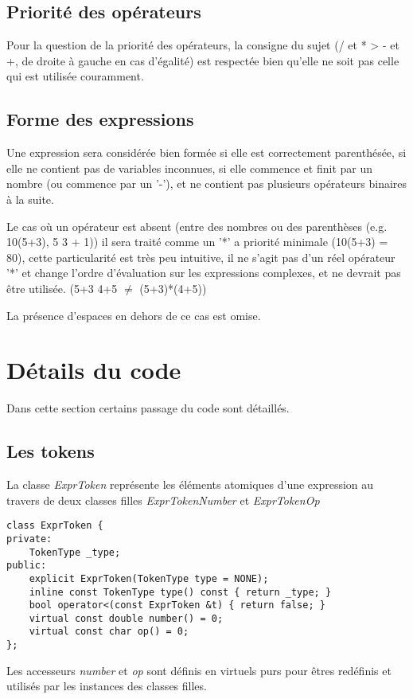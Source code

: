 \documentclass[]{article}
\begin{document}
\subsection{Priorité des opérateurs}
Pour la question de la priorité des opérateurs, la consigne du sujet (/ et * > - et +, de droite à gauche en cas d'égalité) est respectée bien qu'elle ne soit pas celle qui est utilisée couramment.

\subsection{Forme des expressions}
Une expression sera considérée bien formée si elle est correctement parenthésée, si elle ne contient pas 
de variables inconnues, si elle commence et finit par un nombre (ou commence par un '-'), et ne contient pas plusieurs opérateurs binaires à la suite.

Le cas où un opérateur est absent (entre des nombres ou des parenthèses (e.g. 10(5+3), 5 3 + 1)) il sera traité comme un '*' a priorité minimale (10(5+3) = 80), cette particularité est très peu intuitive, il ne s'agit pas d'un réel opérateur '*' et change l'ordre d'évaluation sur les expressions complexes, et ne devrait pas être utilisée. (5+3 4+5 $\ne$ (5+3)*(4+5))

La présence d'espaces en dehors de ce cas est omise.

\section{Détails du code}
Dans cette section certains passage du code sont détaillés.

\subsection{Les tokens}
La classe \textit{ExprToken} représente les éléments atomiques d'une expression au travers de deux classes filles \textit{ExprTokenNumber} et \textit{ExprTokenOp}\\

\begin{lstlisting}
class ExprToken {
private:
    TokenType _type;
public:
    explicit ExprToken(TokenType type = NONE);
    inline const TokenType type() const { return _type; }
    bool operator<(const ExprToken &t) { return false; }
    virtual const double number() = 0;
    virtual const char op() = 0;
};
\end{lstlisting}
Les accesseurs \textit{number} et \textit{op} sont définis en virtuels purs pour êtres redéfinis et utilisés par les instances des classes filles.
\end{document}
